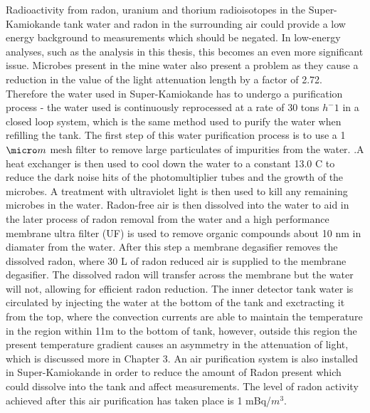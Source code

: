 Radioactivity from radon, uranium and thorium radioisotopes in the Super-Kamiokande tank water and radon in the surrounding air could provide a low energy background to measurements which should be negated. In low-energy analyses, such as the analysis in this thesis, this becomes an even more significant issue. Microbes present in the mine water also present a problem as they cause a reduction in the value of the light attenuation length by a factor of 2.72. Therefore the water used in Super-Kamiokande has to undergo a purification process - the water used is continuously reprocessed at a rate of 30 tons $h^-1$ in a closed loop system, which is the same method used to purify the water when refilling the tank. The first step of this water purification process is to use a 1$\micro m$ mesh filter to remove large particulates of impurities from the water. \cite{fernandezmenendezNeutrinoPhysicsPresent2018}.A heat exchanger is then used to cool down the water to a constant 13.0 \degree C to reduce the dark noise hits of the photomultiplier tubes and the growth of the microbes. A treatment with ultraviolet light is then used to kill any remaining microbes in the water. Radon-free air is then dissolved into the water to aid in the later process of radon removal from the water and a high performance membrane ultra filter (UF) is used to remove organic compounds about 10 nm in diamater from the water. After this step a membrane degasifier removes the dissolved radon, where 30 L of radon reduced air is supplied to the membrane degasifier. The dissolved radon will transfer across the membrane but the water will not, allowing for efficient radon reduction. The inner detector tank water is circulated by injecting the water at the bottom of the tank and exctracting it from the top, where the convection currents are able to maintain the temperature in the region within 11m to the bottom of tank, however, outside this region the present temperature gradient causes an asymmetry in the attenuation of light, which is discussed more in Chapter 3. 
\newline
 An air purification system is also installed in Super-Kamiokande in order to reduce the amount of Radon present which could dissolve into the tank and affect measurements. The level of radon activity achieved after this air purification has taken place is 1 mBq/$m^{3}$.

